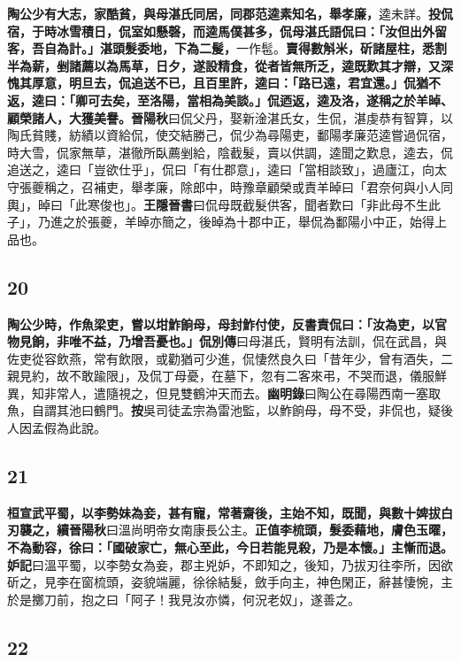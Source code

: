 \textbf{陶公少有大志，家酷貧，與母湛氏同居，同郡范逵素知名，舉孝廉，}{\footnotesize 逵未詳。}\textbf{投侃宿，于時冰雪積日，侃室如懸磬，而逵馬僕甚多，侃母湛氏語侃曰：「汝但出外留客，吾自為計。」湛頭髮委地，下為二髲，}{\footnotesize 一作髢。}\textbf{賣得數斛米，斫諸屋柱，悉割半為薪，剉諸薦以為馬草，日夕，遂設精食，從者皆無所乏，逵既歎其才辯，又深愧其厚意，明旦去，侃追送不已，且百里許，逵曰：「路已遠，君宜還。」侃猶不返，逵曰：「卿可去矣，至洛陽，當相為美談。」侃迺返，逵及洛，遂稱之於羊晫、顧榮諸人，大獲美譽。}{\footnotesize \textbf{晉陽秋}曰侃父丹，娶新淦湛氏女，生侃，湛虔恭有智算，以陶氏貧賤，紡績以資給侃，使交結勝己，侃少為尋陽吏，鄱陽孝廉范逵嘗過侃宿，時大雪，侃家無草，湛徹所臥薦剉給，陰截髮，賣以供調，逵聞之歎息，逵去，侃追送之，逵曰「豈欲仕乎」，侃曰「有仕郡意」，逵曰「當相談致」，過廬江，向太守張夔稱之，召補吏，舉孝廉，除郎中，時豫章顧榮或責羊晫曰「君奈何與小人同輿」，晫曰「此寒俊也」。\textbf{王隱晉書}曰侃母既截髮供客，聞者歎曰「非此母不生此子」，乃進之於張夔，羊晫亦簡之，後晫為十郡中正，舉侃為鄱陽小中正，始得上品也。}

\subsection*{20}

\textbf{陶公少時，作魚梁吏，嘗以坩鮓餉母，母封鮓付使，反書責侃曰：「汝為吏，以官物見餉，非唯不益，乃增吾憂也。」}{\footnotesize \textbf{侃別傳}曰母湛氏，賢明有法訓，侃在武昌，與佐吏從容飲燕，常有飲限，或勸猶可少進，侃悽然良久曰「昔年少，曾有酒失，二親見約，故不敢踰限」，及侃丁母憂，在墓下，忽有二客來弔，不哭而退，儀服鮮異，知非常人，遣隨視之，但見雙鶴沖天而去。\textbf{幽明錄}曰陶公在尋陽西南一塞取魚，自謂其池曰鶴門。\textbf{按}吳司徒孟宗為雷池監，以鮓餉母，母不受，非侃也，疑後人因孟假為此說。}

\subsection*{21}

\textbf{桓宣武平蜀，以李勢妹為妾，甚有寵，常著齋後，主始不知，既聞，與數十婢拔白刃襲之，}{\footnotesize \textbf{續晉陽秋}曰溫尚明帝女南康長公主。}\textbf{正值李梳頭，髮委藉地，膚色玉曜，不為動容，徐曰：「國破家亡，無心至此，今日若能見殺，乃是本懷。」主慚而退。}{\footnotesize \textbf{妒記}曰溫平蜀，以李勢女為妾，郡主兇妒，不即知之，後知，乃拔刃往李所，因欲斫之，見李在窗梳頭，姿貌端麗，徐徐結髮，斂手向主，神色閑正，辭甚悽惋，主於是擲刀前，抱之曰「阿子！我見汝亦憐，何況老奴」，遂善之。}

\subsection*{22}

